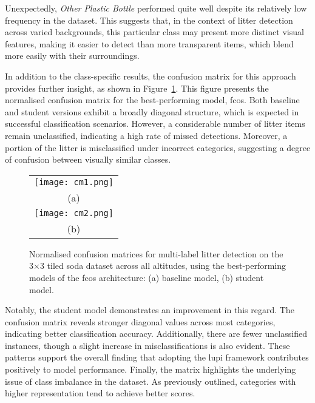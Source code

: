 Unexpectedly, \textit{Other Plastic Bottle} performed quite well despite its relatively low frequency in the dataset. This suggests that, in the context of litter detection across varied backgrounds, this particular class may present more distinct visual features, making it easier to detect than more transparent items, which blend more easily with their surroundings.

In addition to the class-specific results, the confusion matrix for this approach provides further insight, as shown in Figure~\ref{fig:cm_soda}. This figure presents the normalised confusion matrix for the best-performing model, \gls{fcos}. Both baseline and student versions exhibit a broadly diagonal structure, which is expected in successful classification scenarios. However, a considerable number of litter items remain unclassified, indicating a high rate of missed detections. Moreover, a portion of the litter is misclassified under incorrect categories, suggesting a degree of confusion between visually similar classes.
\begin{figure}[!htbp]
  \centering
  \begin{tabular}{c}
    \texttt{[image: cm1.png]} \\
    \small (a) \\
    \addlinespace[1em]
    \texttt{[image: cm2.png]} \\
    \small (b) \\
  \end{tabular}
  \caption{Normalised confusion matrices for multi-label litter detection on the 3$\times$3 tiled \gls{soda} dataset across all altitudes, using the best-performing models of the \gls{fcos} architecture: (a) baseline model, (b) student model.}
  \label{fig:cm_soda}
\end{figure}

Notably, the student model demonstrates an improvement in this regard. The confusion matrix reveals stronger diagonal values across most categories, indicating better classification accuracy. Additionally, there are fewer unclassified instances, though a slight increase in misclassifications is also evident. These patterns support the overall finding that adopting the \gls{lupi} framework contributes positively to model performance.
Finally, the matrix highlights the underlying issue of class imbalance in the dataset. As previously outlined, categories with higher representation tend to achieve better scores.

